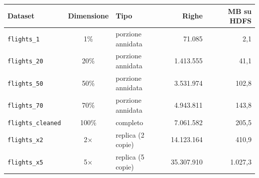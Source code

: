 \begin{tabular}{@{}l c l r r@{}}
\toprule
Dataset & Dimensione & Tipo & Righe & MB su HDFS \\
\midrule
\texttt{flights\_1} & 1\% & porzione annidata & 71.085 & 2,1 \\
\texttt{flights\_20} & 20\% & porzione annidata & 1.413.555 & 41,1 \\
\texttt{flights\_50} & 50\% & porzione annidata & 3.531.974 & 102,8 \\
\texttt{flights\_70} & 70\% & porzione annidata & 4.943.811 & 143,8 \\
\texttt{flights\_cleaned} & 100\% & completo & 7.061.582 & 205,5 \\
\texttt{flights\_x2} & 2× & replica (2 copie) & 14.123.164 & 410,9 \\
\texttt{flights\_x5} & 5× & replica (5 copie) & 35.307.910 & 1.027,3 \\
\bottomrule
\end{tabular}